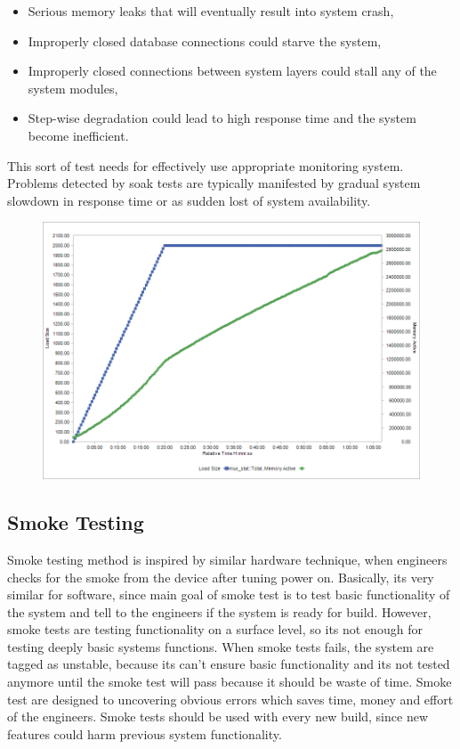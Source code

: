 \begin{itemize}
	\setlength\itemsep{0em}
	\item Serious memory leaks that will eventually result into system crash,
	\item Improperly closed database connections could starve the system,
	\item Improperly closed connections between system layers could stall any of the system modules,
	\item Step-wise degradation could lead to high response time and the system become inefficient.
\end{itemize}

This sort of test needs for effectively use appropriate monitoring system. Problems detected by soak tests are typically manifested by gradual system slowdown in response time or as sudden lost of system availability.

\begin{figure}[H]
  \centering
  \includegraphics[width=15cm]{obrazky-figures/soak-testing.png}
  \caption{}
  \label{fig:soak_test}
\end{figure}

\subsection*{Smoke Testing}
Smoke testing method is inspired by similar hardware technique, when engineers checks for the smoke from the device after tuning power on. Basically, its very similar for software, since main goal of smoke test is to test basic functionality of the system and tell to the engineers if the system is ready for build. However, smoke tests are testing functionality on a surface level, so its not enough for testing deeply basic systems functions. When smoke tests fails, the system are tagged as unstable, because its can't ensure basic functionality and its not tested anymore until the smoke test will pass because it should be waste of time. Smoke test are designed to uncovering obvious errors which saves time, money and effort of the engineers. Smoke tests should be used with every new build, since new features could harm previous system functionality. 


